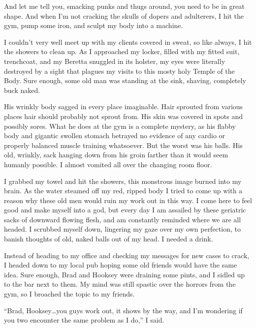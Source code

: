 And let me tell you, smacking punks and thugs around, you need to
be in great shape. And when I'm not cracking the skulls of dopers
and adulterers, I hit the gym, pump some iron, and sculpt my body
into a machine.



I couldn't very well meet up with my clients covered in sweat, so
like always, I hit the showers to clean up. As I approached my
locker, filled with my fitted suit, trenchcoat, and my Beretta
snuggled in its holster, my eyes were literally destroyed by a
sight that plagues my visits to this mosty holy Temple of the Body.
Sure enough, some old man was standing at the sink, shaving,
completely buck naked.



His wrinkly body sagged in every place imaginable. Hair sprouted
from various places hair should probably not sprout from. His skin
was covered in spots and possibly sores. What he does at the gym is
a complete mystery, as his flabby body and gigantic swollen stomach
betrayed no evidence of any cardio or properly balanced muscle
training whatsoever. But the worst was his balls. His old, wrinkly,
sack hanging down from his groin farther than it would seem humanly
possible. I almost vomited all over the changing room floor.



I grabbed my towel and hit the showers, this monstrous image burned
into my brain. As the water steamed off my red, ripped body I tried
to come up with a reason why these old men would ruin my work out
in this way. I come here to feel good and make myself into a god,
but every day I am assailed by these geriatric sacks of downward
flowing flesh, and am constantly reminded where we are all headed.
I scrubbed myself down, lingering my gaze over my own perfection,
to banish thoughts of old, naked balls out of my head. I needed a
drink.



Instead of heading to my office and checking my messages for new
cases to crack, I headed down to my local pub hoping some old
friends would have the same idea. Sure enough, Brad and Hooksey
were draining some pints, and I sidled up to the bar next to them.
My mind was still spastic over the horrors from the gym, so I
broached the topic to my friends.



``Brad, Hooksey{\ldots}you guys work out, it shows by the way, and I'm
wondering if you two encounter the same problem as I do,'' I
said.



